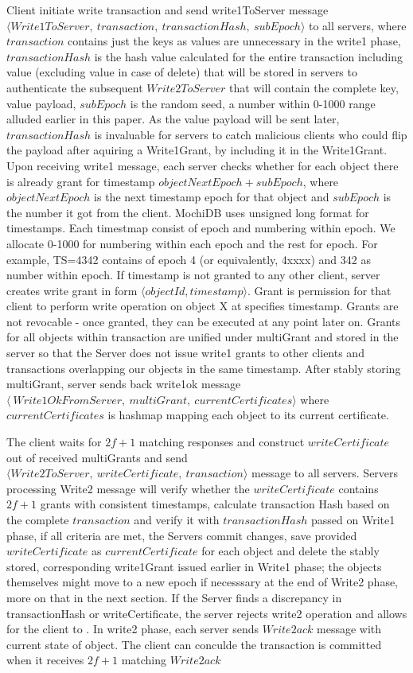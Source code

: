 \documentclass[letterpaper,twocolumn,10pt]{article}
\begin{document}
Client initiate write transaction and send write1ToServer message $\langle Write1ToServer,\ transaction,\ transactionHash,\ subEpoch \rangle$ to all servers, where $transaction$ contains just the keys as values are unnecessary in the write1 phase, $transactionHash$ is the hash value calculated for the entire transaction including value (excluding value in case of delete) that will be stored in servers to authenticate the subsequent $Write2ToServer$ that will contain the complete key, value payload, $subEpoch$ is the random seed, a number within 0-1000 range alluded earlier in this paper. As the value payload will be sent later, $transactionHash$ is invaluable for servers to catch malicious clients who could flip the payload after aquiring a Write1Grant, by including it in the Write1Grant. Upon receiving write1 message, each server checks whether for each object there is already grant for timestamp $objectNextEpoch + subEpoch$, where $objectNextEpoch$ is the next timestamp epoch for that object and $subEpoch$ is the number it got from the client. MochiDB uses unsigned long format for timestamps. Each timestmap consist of epoch and numbering within epoch. We allocate 0-1000 for numbering within each epoch and the rest for epoch. For example, TS=4342 contains of epoch 4 (or equivalently, 4xxxx) and 342 as number within epoch. If timestamp is not granted to any other client, server creates write grant in form $\langle objectId, timestamp \rangle$. Grant is permission for that client to perform write operation on object X at specifies timestamp. Grants are not revocable - once granted, they can be executed at any point later on. Grants for all objects within transaction are unified under multiGrant and stored in the server so that the Server does not issue write1 grants to other clients and transactions overlapping our objects in the same timestamp. After stably storing multiGrant, server sends back write1ok message $\langle\ Write1OkFromServer,\ multiGrant,\ currentCertificates \rangle$ where $currentCertificates$ is hashmap mapping each object to its current certificate.

The client waits for $2f+1$ matching responses and construct $writeCertificate$ out of received multiGrants and send $\langle Write2ToServer,\ writeCertificate,\ transaction \rangle$ message to all servers. Servers processing Write2 message will verify whether the $writeCertificate$ contains $2f+1$ grants with consistent timestamps, calculate transaction Hash based on the complete $transaction$ and verify it with $transactionHash$ passed on Write1 phase, if all criteria are met, the Servers commit changes, save provided $writeCertificate$ as $currentCertificate$ for each object and delete the stably stored, corresponding write1Grant issued earlier in Write1 phase; the objects themselves might move to a new epoch if necesssary at the end of Write2 phase, more on that in the next section. If the Server finds a discrepancy in transactionHash or writeCertificate, the server rejects write2 operation and allows for the client to . In write2 phase, each server sends $Write2ack$ message with current state of object. The client can conculde the transaction is committed when it receives $2f+1$ matching $Write2ack$
\end{document}
